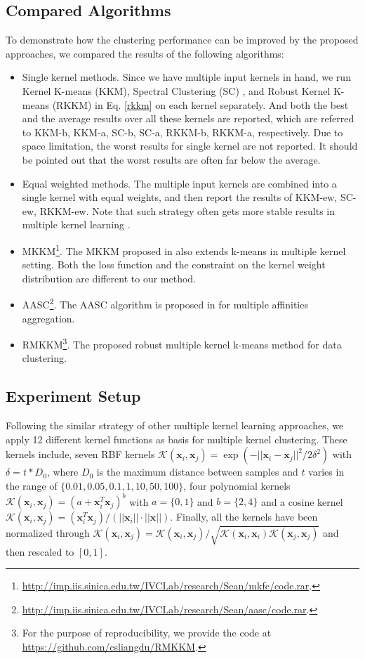 \documentclass{article}
\begin{document}
\subsection{Compared Algorithms}
To demonstrate how the clustering performance can be improved by the proposed approaches, we compared the results of the following algorithms:
\begin{itemize}
  \item Single kernel methods. Since we have multiple input kernels in hand, we run Kernel K-means (KKM), Spectral Clustering (SC) \cite{ng2002spectral}, and Robust Kernel K-means (RKKM) in Eq. \eqref{rkkm} on each kernel separately. And both the best and the average results over all these kernels are reported, which are referred to KKM-b, KKM-a, SC-b, SC-a, RKKM-b, RKKM-a, respectively. Due to space limitation, the worst results for single kernel are not reported. It should be pointed out that the worst results are often far below the average.
  \item Equal weighted methods. The multiple input kernels are combined into a single kernel with equal weights, and then report the results of KKM-ew, SC-ew, RKKM-ew. Note that such strategy often gets more stable results in multiple kernel learning \cite{gonen2011multiple}.
  \item MKKM\footnote{\url{http://imp.iis.sinica.edu.tw/IVCLab/research/Sean/mkfc/code.rar}.}.
  The MKKM proposed in \cite{huang2012multiple} also extends k-means in multiple kernel setting. Both the loss function and the constraint on the kernel weight distribution are different to our method.
  \item AASC\footnote{\url{http://imp.iis.sinica.edu.tw/IVCLab/research/Sean/aasc/code.rar}.}.
  The AASC algorithm is proposed in \cite{huang2012affinity} for multiple affinities aggregation.
  \item RMKKM\footnote{For the purpose of reproducibility, we provide the code at \url{https://github.com/csliangdu/RMKKM}.}. The proposed robust multiple kernel k-means method for data clustering.
\end{itemize}

\subsection{Experiment Setup}
Following the similar strategy of other multiple kernel learning approaches, we apply 12 different kernel functions as basis for multiple kernel clustering. These kernels include, seven RBF kernels $\mathcal{K}(\bm{x}_i, \bm{x}_j) = \exp(-||\bm{x}_i -  \bm{x}_j||^2 /2 \delta^2)$ with $\delta = t * D_0$, where $D_0$ is the maximum distance between samples and $t$ varies in the range of $\{0.01, 0.05, 0.1, 1, 10, 50, 100\}$, four polynomial kernels $\mathcal{K}(\bm{x}_i, \bm{x}_j) = (a + \bm{x}_i^T \bm{x}_j)^b$ with $a = \{0, 1\}$ and $b = \{2, 4\}$ and a cosine kernel $\mathcal{K}(\bm{x}_i, \bm{x}_j) = (\bm{x}_i^T \bm{x}_j)/(||\bm{x}_i||\cdot|| \bm{x}||)$. Finally, all the kernels have been normalized through $\mathcal{K}(\bm{x}_i, \bm{x}_j) = \mathcal{K}(\bm{x}_i, \bm{x}_j)/\sqrt{\mathcal{K}(\bm{x}_i, \bm{x}_i)\mathcal{K}(\bm{x}_j, \bm{x}_j)}$ and then rescaled to $[0,1]$.
\end{document}
